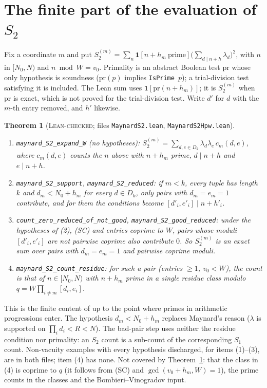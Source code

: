 \documentclass[11pt]{amsart}
\newtheorem{theorem}{Theorem}
\theoremstyle{definition}
\theoremstyle{remark}
\newcommand{\lbl}[1]{\textup{\textsc{#1}}}
\newcommand{\tl}[1]{\texttt{#1}}
\begin{document}
\section{The finite part of the evaluation of \texorpdfstring{$S_2$}{S2}}\label{sec:s2}

Fix a coordinate $m$ and put
$S_2^{(m)}=\sum_{n}\mathbf 1[n+h_m\ \text{prime}]\big(\sum_{d\mid n+h}\lambda_d\big)^2$,
with $n$ in $[N_0,N)$ and $n\bmod W=v_0$. Primality is an abstract Boolean test
$\mathrm{pr}$ whose only hypothesis is soundness ($\mathrm{pr}(p)$ implies
\tl{IsPrime}\ $p$); a trial-division test satisfying it is included. The Lean sum uses
$\mathbf 1[\mathrm{pr}(n+h_m)]$; it is $S_2^{(m)}$ when $\mathrm{pr}$ is exact, which is
not proved for the trial-division test. Write
$d'$ for $d$ with the $m$-th entry removed, and $h'$ likewise.

\begin{theorem}[\lbl{Lean-checked}; files \tl{MaynardS2.lean}, \tl{MaynardS2Hpw.lean}]\label{thm:s2}
\begin{enumerate}
\item \tl{maynard\_S2\_expand\_W} (no hypotheses): $S_2^{(m)}=\sum_{d,e\in D_k}\lambda_d\lambda_e\,c_m(d,e)$,
where $c_m(d,e)$ counts the $n$ above with $n+h_m$ prime, $d\mid n+h$ and $e\mid n+h$.
\item \tl{maynard\_S2\_support}, \tl{maynard\_S2\_reduced}: if $m<k$, every tuple has
length $k$ and $d_m<N_0+h_m$ for every $d\in D_k$, only pairs with $d_m=e_m=1$
contribute, and for them the conditions become $[d'_i,e'_i]\mid n+h'_i$.
\item \tl{count\_zero\_reduced\_of\_not\_good}, \tl{maynard\_S2\_good\_reduced}: under
the hypotheses of (2), (SC) and entries coprime to $W$, pairs whose moduli $[d'_i,e'_i]$ are not
pairwise coprime also contribute $0$. So $S_2^{(m)}$ is an exact sum over pairs
with $d_m=e_m=1$ and pairwise coprime moduli.
\item \tl{maynard\_S2\_count\_residue}: for such a pair (entries $\ge1$,
$v_0<W$), the count is that of $n\in[N_0,N)$ with $n+h_m$ prime in a single
residue class modulo $q=W\prod_{i\ne m}[d_i,e_i]$.
\end{enumerate}
\end{theorem}

\noindent This is the finite content of \cite[Lemma~5.2]{May15} up to the
point where primes in arithmetic progressions enter. The hypothesis
$d_m<N_0+h_m$ replaces Maynard's reason ($\lambda$ is supported on
$\prod_id_i<R<N$). The bad-pair step uses neither the residue condition nor
primality: an $S_2$ count is a sub-count of the corresponding $S_1$ count.
Non-vacuity examples with every hypothesis discharged, for items (1)--(3), are in both
files; item (4) has none.
Not covered by Theorem~\ref{thm:s2}: that the class in (4) is coprime to $q$ (it follows from (SC) and
$\gcd(v_0+h_m,W)=1$), the prime counts in the classes and the Bombieri--Vinogradov input.
\end{document}
